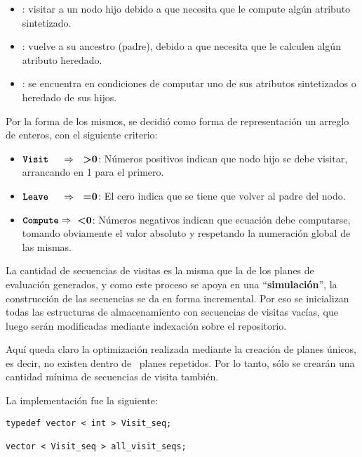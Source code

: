 \begin{itemize}
\item {}: visitar a un nodo hijo debido a que necesita que le compute algún atributo sintetizado.
\item {}: vuelve a su ancestro (padre), debido a que necesita que le calculen algún atributo heredado.
\item {}: se encuentra en condiciones de computar uno de sus atributos sintetizados o heredado de sus hijos.
\end{itemize}

Por la forma de los mismos, se decidió como forma de representación un arreglo de enteros, con el siguiente criterio:

\begin{itemize}
\item $\textttb{Visit}\ \ \ \  \Rightarrow \ \ \textbf{>0}$: Números positivos indican que nodo hijo se debe visitar, arrancando en 1 para el primero.
\item $\textttb{Leave}\ \ \ \  \Rightarrow \ \ \textbf{=0}$: El cero indica que se tiene que volver al padre del nodo.
\item $\textttb{Compute} \Rightarrow \ \textbf{<0}$: Números negativos indican que ecuación debe computarse, tomando obviamente el valor absoluto y respetando la numeración global de las mismas.
\end{itemize}

La cantidad de secuencias de visitas es la misma que la de los planes de evaluación generados, y como este proceso se apoya en una ``\textbf{simulación}'', la construcción de las secuencias se da en forma incremental. Por eso se inicializan todas las estructuras de almacenamiento con secuencias de visitas vacías, que luego serán modificadas mediante indexación sobre el repositorio.

Aquí queda claro la optimización realizada mediante la creación de planes únicos, es decir, no existen dentro de \maggen\ planes repetidos. Por lo tanto, sólo se crearán una cantidad mínima de secuencias de visita también. 


La implementación fue la siguiente:

\begin{lstlisting}[columns=fullflexible, linewidth=7cm]
typedef vector < int > Visit_seq;

vector < Visit_seq > all_visit_seqs;
\end{lstlisting}

